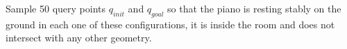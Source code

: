\question{[5]}

Sample 50 query points $q_{init}$ and $q_{goal}$ so that the piano is resting
stably on the ground in each one of these configurations, it is inside the
room and does not intersect with any other geometry.